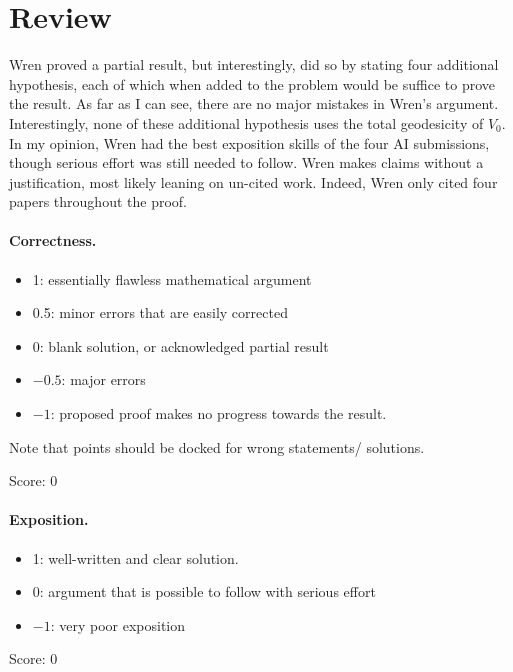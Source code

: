 \documentclass[11pt]{article}
\theoremstyle{definition}
\theoremstyle{remark}
\begin{document}
\maketitle

\section{Review}
Wren proved a partial result, but interestingly, did so by stating four additional hypothesis, each of which when added to the problem would be suffice to prove the result. As far as I can see, there are no major mistakes in Wren's argument. Interestingly, none of these additional hypothesis uses the total geodesicity of $V_0$. In my opinion, Wren had the best exposition skills of the four AI submissions, though serious effort was still needed to follow. Wren makes claims without a justification, most likely leaning on un-cited work. Indeed, Wren only cited four papers throughout the proof.

\paragraph{Correctness.}
\begin{itemize}
	\item  1: essentially flawless mathematical argument
	\item  0.5: minor errors that are easily corrected
	\item  0: blank solution, or acknowledged partial result
	\item  $-0.5$: major errors
	\item  $-1$: proposed proof makes no progress towards the result.
\end{itemize}
Note that points should be docked for wrong statements/ solutions.

\noindent Score: 0

\paragraph{Exposition.}
\begin{itemize}
	\item  1: well-written and clear solution.
	\item  0: argument that is possible to follow with serious effort
	\item  $-1$: very poor exposition
\end{itemize}

\noindent Score: 0
\end{document}

